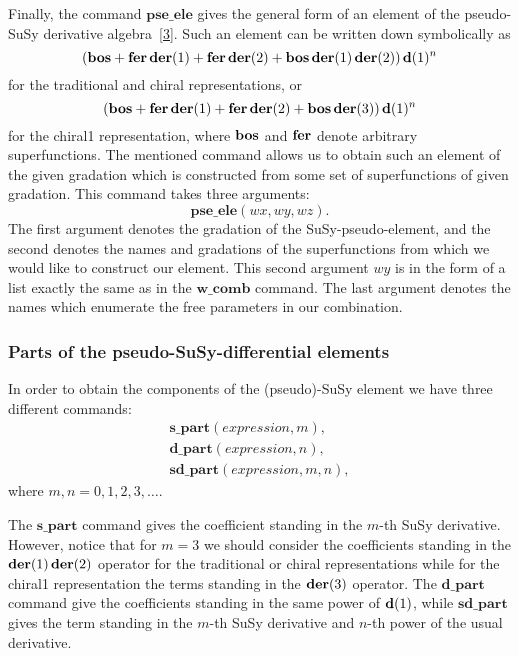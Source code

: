 {Finally, the command $\mathbf{pse\_ele}$ gives the general form of an
element of the pseudo-SuSy derivative
algebra~\hyperlink{susy2-bib}{[3]}.  Such an element can be written
down symbolically as
\begin{equation*}
  (\mathbf{bos} + \mathbf{fer}\,\mathbf{der}(1)+\mathbf{fer}\,\mathbf{der}(2)+\mathbf{bos}\,\mathbf{der}(1)\,\mathbf{der}(2))\,\mathbf{d}(1)^n
\end{equation*}
for the traditional and chiral representations, or
\begin{equation*}
  (\mathbf{bos} + \mathbf{fer}\,\mathbf{der}(1)+\mathbf{fer}\,\mathbf{der}(2)+\mathbf{bos}\,\mathbf{der}(3))\,\mathbf{d}(1)^n
\end{equation*}
for the chiral1 representation, where $\mathbf{bos}$ and $\mathbf{fer}$ denote
arbitrary superfunctions.  The mentioned command allows us to obtain
such an element of the given gradation which is constructed from some set
of superfunctions of given gradation.  This command takes three
arguments:
\begin{equation*}
  \mathbf{pse\_ele}(\mathit{wx},\mathit{wy},\mathit{wz}).
\end{equation*}
The first argument denotes the gradation of the SuSy-pseudo-element,
and the second denotes the names and gradations of the superfunctions
from which we would like to construct our element.  This second
argument $wy$ is in the form of a list exactly the same as in the
$\mathbf{w\_comb}$ command.  The last argument denotes the names which
enumerate the free parameters in our combination.

\subsubsection*{Parts of the pseudo-SuSy-differential elements}

In order to obtain the components of the (pseudo)-SuSy element we have
three different commands:
\begin{gather*}
  \mathbf{s\_part}(\mathit{expression},m), \\
  \mathbf{d\_part}(\mathit{expression},n), \\
  \mathbf{sd\_part}(\mathit{expression},m,n),
\end{gather*}
where $m,n=0,1,2,3,\ldots$.

The $\mathbf{s\_part}$ command gives the coefficient standing in the
$m$-th SuSy derivative.  However, notice that for $m=3$ we should
consider the coefficients standing in the $\mathbf{der}(1)\,\mathbf{der}(2)$ operator
for the traditional or chiral representations while for the chiral1
representation the terms standing in the $\mathbf{der}(3)$ operator.  The
$\mathbf{d\_part}$ command give the coefficients standing in the same
power of $\mathbf{d}(1)$, while $\mathbf{sd\_part}$ gives the term standing in
the $m$-th SuSy derivative and $n$-th power of the usual derivative.

}
